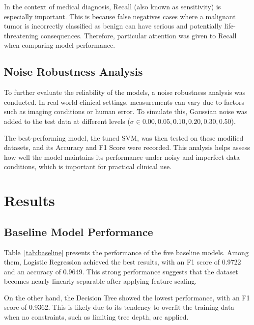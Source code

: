 \documentclass[conference]{IEEEtran}
\begin{document}
In the context of medical diagnosis, Recall (also known as sensitivity) is especially important. This is because false negatives cases where a malignant tumor is incorrectly classified as benign can have serious and potentially life-threatening consequences. Therefore, particular attention was given to Recall when comparing model performance.

\subsection{Noise Robustness Analysis}

To further evaluate the reliability of the models, a noise robustness analysis was conducted. In real-world clinical settings, measurements can vary due to factors such as imaging conditions or human error. To simulate this, Gaussian noise was added to the test data at different levels ($\sigma \in {0.00, 0.05, 0.10, 0.20, 0.30, 0.50}$).

The best-performing model, the tuned SVM, was then tested on these modified datasets, and its Accuracy and F1 Score were recorded. This analysis helps assess how well the model maintains its performance under noisy and imperfect data conditions, which is important for practical clinical use.

\section{Results}

\subsection{Baseline Model Performance}

Table~\ref{tab:baseline} presents the performance of the five baseline models. Among them, Logistic Regression achieved the best results, with an F1 score of 0.9722 and an accuracy of 0.9649. This strong performance suggests that the dataset becomes nearly linearly separable after applying feature scaling.

On the other hand, the Decision Tree showed the lowest performance, with an F1 score of 0.9362. This is likely due to its tendency to overfit the training data when no constraints, such as limiting tree depth, are applied.
\end{document}
